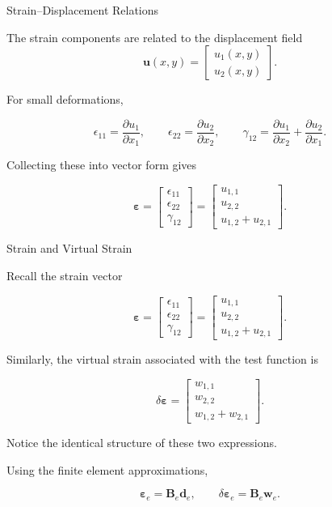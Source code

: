 \documentclass[aspectratio=169]{beamer}
\begin{document}
\begin{frame}{Strain–Displacement Relations}

The strain components are related to the displacement field
\[
\mathbf{u}(x,y) =
\begin{bmatrix}
u_1(x,y)\\
u_2(x,y)
\end{bmatrix}.
\]

For small deformations,

\[
\epsilon_{11} = \frac{\partial u_1}{\partial x_1},
\qquad
\epsilon_{22} = \frac{\partial u_2}{\partial x_2},
\qquad
\gamma_{12} =
\frac{\partial u_1}{\partial x_2}
+
\frac{\partial u_2}{\partial x_1}.
\]

Collecting these into vector form gives

\[
\boldsymbol{\varepsilon}=
\begin{bmatrix}
\epsilon_{11}\\
\epsilon_{22}\\
\gamma_{12}
\end{bmatrix}
=
\begin{bmatrix}
u_{1,1}\\
u_{2,2}\\
u_{1,2}+u_{2,1}
\end{bmatrix}.
\]

\end{frame}

\begin{frame}{Strain and Virtual Strain}

Recall the strain vector

\[
\boldsymbol{\varepsilon}=
\begin{bmatrix}
\epsilon_{11}\\
\epsilon_{22}\\
\gamma_{12}
\end{bmatrix}
=
\begin{bmatrix}
u_{1,1}\\
u_{2,2}\\
u_{1,2}+u_{2,1}
\end{bmatrix}.
\]

Similarly, the virtual strain associated with the test function is

\[
\delta\boldsymbol{\varepsilon}=
\begin{bmatrix}
w_{1,1}\\
w_{2,2}\\
w_{1,2}+w_{2,1}
\end{bmatrix}.
\]

Notice the identical structure of these two expressions.

\bigskip

Using the finite element approximations,

\[
\boxed{\boldsymbol{\varepsilon}_e = \mathbf{B}_e \mathbf{d}_e},
\qquad
\boxed{\delta\boldsymbol{\varepsilon}_e = \mathbf{B}_e \mathbf{w}_e}.
\]

\end{frame}
\end{document}
